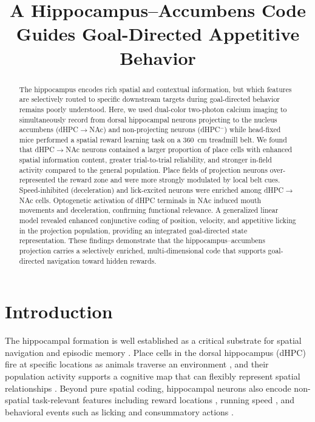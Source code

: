 \documentclass[11pt]{article}
\title{A Hippocampus--Accumbens Code Guides Goal-Directed Appetitive Behavior}
\author{%
}
\date{}
\begin{document}
\maketitle

\begin{abstract}
The hippocampus encodes rich spatial and contextual information, but which features are selectively routed to specific downstream targets during goal-directed behavior remains poorly understood. Here, we used dual-color two-photon calcium imaging to simultaneously record from dorsal hippocampal neurons projecting to the nucleus accumbens (dHPC$\to$NAc) and non-projecting neurons (dHPC$^-$) while head-fixed mice performed a spatial reward learning task on a 360~cm treadmill belt. We found that dHPC$\to$NAc neurons contained a larger proportion of place cells with enhanced spatial information content, greater trial-to-trial reliability, and stronger in-field activity compared to the general population. Place fields of projection neurons over-represented the reward zone and were more strongly modulated by local belt cues. Speed-inhibited (deceleration) and lick-excited neurons were enriched among dHPC$\to$NAc cells. Optogenetic activation of dHPC terminals in NAc induced mouth movements and deceleration, confirming functional relevance. A generalized linear model revealed enhanced conjunctive coding of position, velocity, and appetitive licking in the projection population, providing an integrated goal-directed state representation. These findings demonstrate that the hippocampus--accumbens projection carries a selectively enriched, multi-dimensional code that supports goal-directed navigation toward hidden rewards.
\end{abstract}

\section{Introduction}

The hippocampal formation is well established as a critical substrate for spatial navigation and episodic memory \citep{OKeefe1971,Moser2008,Eichenbaum2014}. Place cells in the dorsal hippocampus (dHPC) fire at specific locations as animals traverse an environment \citep{OKeefe1971,Wilson1993}, and their population activity supports a cognitive map that can flexibly represent spatial relationships \citep{OKeefe1978,Moser2015}. Beyond pure spatial coding, hippocampal neurons also encode non-spatial task-relevant features including reward locations \citep{Gauthier2018,Dupret2010}, running speed \citep{McNaughton1983,Kropff2015}, and behavioral events such as licking and consummatory actions \citep{Aronov2017}.
\end{document}
